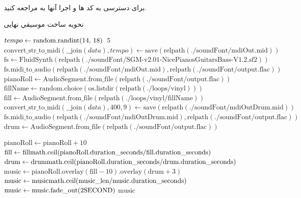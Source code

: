  برای دسترسی به کد ها و اجرا آنها به  مراجعه کنید.

\begin{LTR}
      \begin{algorithm}[H]
            \caption{نحویه ساخت موسیقي نهایی}
            \label{algo:lofi_music}
            \setmainfont{Times New Roman}
            \begin{algorithmic}[1]
                  \State $tempo \gets \text{random.randint(14, 18) \* 5}$ 
                  \State $\text{convert\_str\_to\_midi}(\text{\_\_join}(data), tempo) \gets \text{save}(\text{relpath}(\text{./soundFont/mdiOut.mid}))$ 
                  \State $\text{fs} \gets \text{FluidSynth}(\text{relpath}(\text{./soundFont/SGM-v2.01-NicePianosGuitarsBass-V1.2.sf2}))$ 
                  \State $\text{fs.midi\_to\_audio}(\text{relpath}(\text{./soundFont/mdiOut.mid}), \text{relpath}(\text{./soundFont/output.flac}))$ 
                  \State $\text{pianoRoll} \gets \text{AudioSegment.from\_file}(\text{relpath}(\text{./soundFont/output.flac}))$ 
                  \State $\text{fillName} \gets \text{random.choice}(\text{os.listdir}(\text{relpath}(\text{./loops/vinyl})))$ 
                  \State $\text{fill} \gets \text{AudioSegment.from\_file}(\text{relpath}(\text{./loops/vinyl/}\text{fillName}))$ 
                  \State $\text{convert\_str\_to\_midi}(\text{\_\_join}(data), 400, 9) \gets \text{save}(\text{relpath}(\text{./soundFont/mdiOutDrum.mid}))$ 
                  \State $\text{fs.midi\_to\_audio}(\text{relpath}(\text{./soundFont/mdiOutDrum.mid}), \text{relpath}(\text{./soundFont/output.flac}))$ 
                  \State $\text{drum} \gets \text{AudioSegment.from\_file}(\text{relpath}(\text{./soundFont/output.flac}))$ 
                  \EndProcedure

                  \State $\text{pianoRoll} \gets \text{pianoRoll} + 10$ 
                  \State $\text{fill} \gets \text{fill} \* \text{math.ceil}(\text{pianoRoll.duration\_seconds} / \text{fill.duration\_seconds})$ 
                  \State $\text{drum} \gets \text{drum} \* \text{math.ceil}(\text{pianoRoll.duration\_seconds} / \text{drum.duration\_seconds})$ 
                  \State $\text{music} \gets \text{pianoRoll}\text{.overlay}(\text{fill} - 10)\text{.overlay}(\text{drum} + 3)$ 
                  \State $\text{music} \gets \text{music} \* \text{math.ceil}(\text{music\_len} / \text{music.duration\_seconds})$ 
                  \State $\text{music} \gets \text{music.fade\_out}(2 \* \text{SECOND})$ 
                  \State \Return $\text{music}$
                  \EndProcedure
            \end{algorithmic}
      \end{algorithm}
\end{LTR}